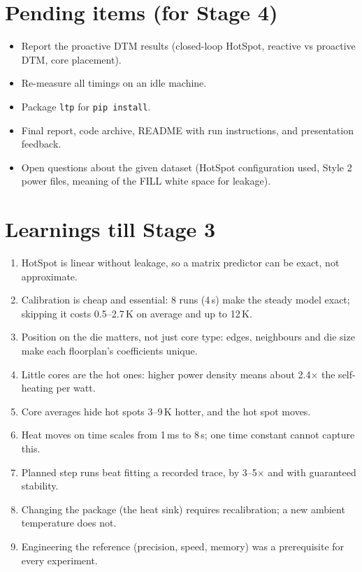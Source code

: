 \documentclass[11pt,a4paper]{article}
\begin{document}
\section{Pending items (for Stage 4)}
\begin{itemize}
  \item Report the proactive DTM results (closed-loop HotSpot, reactive vs proactive DTM, core
        placement).
  \item Re-measure all timings on an idle machine.
  \item Package \texttt{ltp} for \texttt{pip install}.
  \item Final report, code archive, README with run instructions, and presentation feedback.
  \item Open questions about the given dataset (HotSpot configuration used, Style 2 power files,
        meaning of the FILL white space for leakage).
\end{itemize}

\section{Learnings till Stage 3}
\begin{enumerate}
  \item HotSpot is linear without leakage, so a matrix predictor can be exact, not approximate.
  \item Calibration is cheap and essential: 8 runs (4\,s) make the steady model exact; skipping it
        costs 0.5--2.7\,K on average and up to 12\,K.
  \item Position on the die matters, not just core type: edges, neighbours and die size make each
        floorplan's coefficients unique.
  \item Little cores are the hot ones: higher power density means about 2.4$\times$ the
        self-heating per watt.
  \item Core averages hide hot spots 3--9\,K hotter, and the hot spot moves.
  \item Heat moves on time scales from 1\,ms to 8\,s; one time constant cannot capture this.
  \item Planned step runs beat fitting a recorded trace, by 3--5$\times$ and with guaranteed
        stability.
  \item Changing the package (the heat sink) requires recalibration; a new ambient temperature
        does not.
  \item Engineering the reference (precision, speed, memory) was a prerequisite for every
        experiment.
\end{enumerate}
\end{document}
